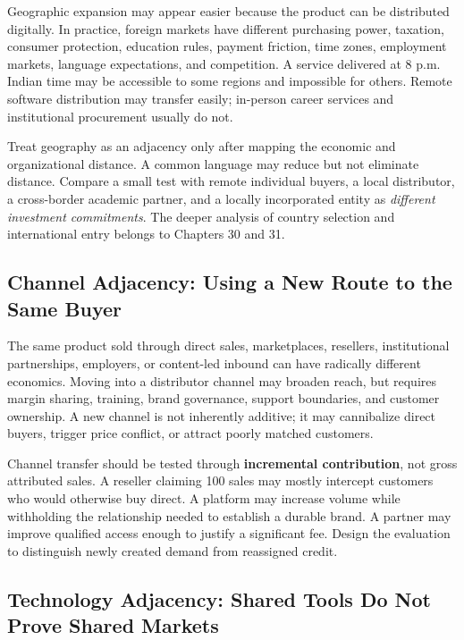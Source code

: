Geographic expansion may appear easier because the product can be distributed digitally. In practice, foreign markets have different purchasing power, taxation, consumer protection, education rules, payment friction, time zones, employment markets, language expectations, and competition. A service delivered at 8 p.m. Indian time may be accessible to some regions and impossible for others. Remote software distribution may transfer easily; in-person career services and institutional procurement usually do not.

Treat geography as an adjacency only after mapping the economic and organizational distance. A common language may reduce but not eliminate distance. Compare a small test with remote individual buyers, a local distributor, a cross-border academic partner, and a locally incorporated entity as \textit{different investment commitments}. The deeper analysis of country selection and international entry belongs to Chapters 30 and 31.

\subsection{Channel Adjacency: Using a New Route to the Same Buyer}
\label{sec:channel_adjacency_new_route}

The same product sold through direct sales, marketplaces, resellers, institutional partnerships, employers, or content-led inbound can have radically different economics. Moving into a distributor channel may broaden reach, but requires margin sharing, training, brand governance, support boundaries, and customer ownership. A new channel is not inherently additive; it may cannibalize direct buyers, trigger price conflict, or attract poorly matched customers.

Channel transfer should be tested through \textbf{incremental contribution}, not gross attributed sales. A reseller claiming 100 sales may mostly intercept customers who would otherwise buy direct. A platform may increase volume while withholding the relationship needed to establish a durable brand. A partner may improve qualified access enough to justify a significant fee. Design the evaluation to distinguish newly created demand from reassigned credit.

\subsection{Technology Adjacency: Shared Tools Do Not Prove Shared Markets}
\label{sec:technology_adjacency_shared_tools}

